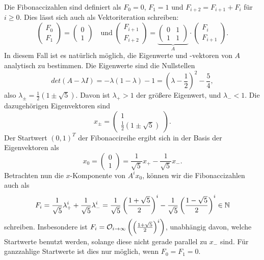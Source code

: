 Die Fibonaccizahlen sind definiert als $F_0 = 0$, $F_1=1$ und
$F_{i+2} = F_{i+1} + F_i$ für $i \ge 0$. Dies lässt sich auch als
Vektoriteration schreiben:
\begin{equation}
  \begin{pmatrix}
    F_0\\
    F_1
  \end{pmatrix}=
  \begin{pmatrix}
    0\\
    1
  \end{pmatrix}
  \quad\text{und}\;
  \begin{pmatrix}
    F_{i+1}\\
    F_{i+2}
  \end{pmatrix}=
  \underbrace{\begin{pmatrix}
      0 & 1\\
      1 & 1
    \end{pmatrix}}_A\cdot
  \begin{pmatrix}
    F_i\\
    F_{i+1}
  \end{pmatrix}.
\end{equation}
In diesem Fall ist es natürlich möglich, die Eigenwerte und -vektoren
von $A$ analytisch zu bestimmen. Die Eigenwerte sind die Nullstellen
\begin{equation}
  det(A-\lambda I) = -\lambda(1-\lambda) - 1 = \left(\lambda
    -\frac{1}{2}\right)^2 - \frac{5}{4},
\end{equation}
also $\lambda_{\pm} = \frac{1}{2} \left(1 \pm \sqrt{5}\right)$. Davon
ist $\lambda_+ > 1$ der größere Eigenwert, und $\lambda_-<1$. Die
dazugehörigen Eigenvektoren sind
\begin{equation}
  x_{\pm} =
  \begin{pmatrix}
    1\\
    \frac{1}{2} \left(1 \pm
      \sqrt{5}\right)
  \end{pmatrix}.
\end{equation}
Der Startwert $(0,1)^T$ der Fibonaccireihe ergibt sich in der Basis
der Eigenvektoren als
\begin{equation}
  x_0 = 
  \begin{pmatrix}
    0\\
    1
  \end{pmatrix} =
  \frac{1}{\sqrt{5}} x_+ - \frac{1}{\sqrt{5}} x_-.
\end{equation}
Betrachten nun die $x$-Komponente von $A^ix_0$, können wir die
Fibonaccizahlen auch als
\begin{equation}
  F_i = \frac{1}{\sqrt{5}}\lambda_+^i + \frac{1}{\sqrt{5}}\lambda_-^i
  = \frac{1}{\sqrt{5}} \left(\frac{1 + \sqrt{5}}{2}\right)^i
  - \frac{1}{\sqrt{5}} \left(\frac{1 - \sqrt{5}}{2}\right)^i \in\mathbb{N}
\end{equation}
schreiben. Insbesondere ist $F_i = \mathcal O_{i\to\infty}\left(\left(\frac{1
      + \sqrt{5}}{2}\right)^i\right)$, unabhängig davon, welche
Startwerte benutzt werden, solange diese nicht gerade parallel zu
$x_-$ sind. Für ganzzahlige Startwerte ist dies nur möglich, wenn
$F_0=F_1=0$. 

